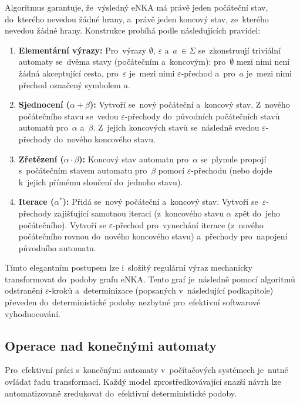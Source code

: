 \documentclass[
  master,
  program=ainfvs,
  printversion,
  figures=false,
  tables=false,
  glossaries,
  index
]{kidiplom}
\begin{document}
Algoritmus garantuje, že~výsledný \gls{eNKA} má právě jeden počáteční stav, do~kterého nevedou žádné hrany, a~právě jeden koncový stav, ze~kterého nevedou žádné hrany. Konstrukce probíhá podle následujících pravidel:

\begin{enumerate}
    \item \textbf{Elementární výrazy:} Pro~výrazy $\emptyset$, $\varepsilon$ a~$a~\in \Sigma$ se~zkonstruují triviální automaty se~dvěma stavy (počátečním a~koncovým): pro~$\emptyset$ mezi nimi není žádná akceptující cesta, pro~$\varepsilon$ je~mezi nimi $\varepsilon$-přechod a~pro~$a$ je~mezi nimi přechod označený symbolem $a$.
    \item \textbf{Sjednocení ($\alpha + \beta$):} Vytvoří se~nový počáteční a~koncový stav. Z~nového počátečního stavu se~vedou $\varepsilon$-přechody do~původních počátečních stavů automatů pro~$\alpha$ a~$\beta$. Z~jejich koncových stavů se~následně svedou $\varepsilon$-přechody do~nového koncového stavu.
    \item \textbf{Zřetězení ($\alpha \cdot \beta$):} Koncový stav automatu pro~$\alpha$ se~plynule propojí s~počátečním stavem automatu pro~$\beta$ pomocí $\varepsilon$-přechodu (nebo dojde k~jejich přímému sloučení do~jednoho stavu).
    \item \textbf{Iterace ($\alpha^*$):} Přidá se~nový počáteční a~koncový stav. Vytvoří se~$\varepsilon$-přecho\-dy zajišťující samotnou iteraci (z~koncového stavu $\alpha$ zpět do~jeho počátečního). Vytvoří se $\varepsilon$-přechod pro~vynechání iterace (z~nového počátečního rovnou do~nového koncového stavu) a~přechody pro~napojení původního automatu.
\end{enumerate}

Tímto elegantním postupem lze i~složitý regulární výraz mechanicky transformovat do~podoby grafu \gls{eNKA}. Tento graf je~následně pomocí algoritmů odstranění $\varepsilon$-kroků a~determinizace (popsaných v~následující podkapitole) převeden do~deterministické podoby nezbytné pro~efektivní softwarové vyhodnocování.

\subsection{Operace nad konečnými automaty}
Pro~efektivní práci s~konečnými automaty v~počítačových systémech je~nutné ovládat řadu transformací. Každý model zprostředkovávající snazší návrh lze automatizovaně zredukovat do~efektivní deterministické podoby.
\end{document}
